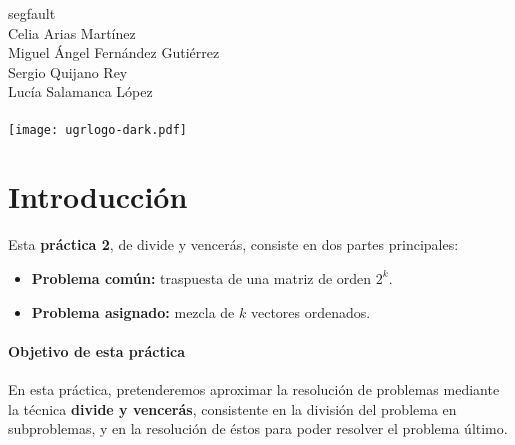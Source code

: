 \documentclass[10pt, a4paper]{article}
\theoremstyle{theorem-style}
\theoremstyle{theorem-style}
\theoremstyle{definition-style}
\theoremstyle{remark-style}
\theoremstyle{example-style}
\theoremstyle{definition-style}
\theoremstyle{remark-style}
\newcommand{\autor}{Celia Arias Martínez\\Miguel Ángel Fernández Gutiérrez\\Sergio Quijano Rey\\Lucía Salamanca López\\\hspace{1cm}}
\newcommand{\grado}{segfault}
\begin{document}
\begin{titlepage}

  \parbox[t]{\textwidth}{
  	\raggedright %
  	\fontsize{40pt}{40pt}\selectfont\sffamily{}
  }

	\vfill
	
	\parbox[t]{\textwidth}{
		\raggedright %
		\sffamily\large
		\grado\\
		{\Large \autor }\\[15pt]
		\texttt{[image: ugrlogo-dark.pdf]}
	}

\end{titlepage}


\thispagestyle{empty}
\tableofcontents
\newpage


\part{Introducción}

Esta \textbf{práctica 2}, de divide y vencerás, consiste en dos partes principales:

\begin{itemize}
	\item \textbf{Problema común:} traspuesta de una matriz de orden $2^k$.
	\item \textbf{Problema asignado:} mezcla de $k$ vectores ordenados.
\end{itemize}

\subsection*{Objetivo de esta práctica}

En esta práctica, pretenderemos aproximar la resolución de problemas mediante la técnica \textbf{divide y vencerás}, consistente en la división del problema en subproblemas, y en la resolución de éstos para poder resolver el problema último.
\end{document}
